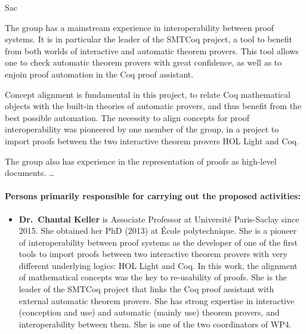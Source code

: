 \begin{sitedescription}{Sac}

The group has a mainstream experience in interoperability between proof
systems. It is in particular the leader of the SMTCoq project, a tool to
benefit from both worlds of interactive and automatic theorem provers.
This tool allows one to check automatic theorem provers with great
confidence, as well as to enjoin proof automation in the Coq proof
assistant.

Concept alignment is fundamental in this project, to relate Coq
mathematical objects with the built-in theories of automatic provers,
and thus benefit from the best possible automation. The necessity to
align concepts for proof interoperability was pioneered by one member of
the group, in a project to import proofs between the two interactive
theorem provers HOL Light and Coq.

The group also has experience in the representation of proofs as
high-level documents. \dots

\paragraph{Persons primarily responsible for carrying out the proposed
  activities:}

\begin{itemize} %

\item {\bf Dr.\ Chantal Keller} is Associate Professor at Université
  Paris-Saclay since 2015. She obtained her PhD (2013) at École
  polytechnique. She is a pioneer of interoperability between proof
  systems as the developer of one of the first tools to import proofs
  between two interactive theorem provers with very different underlying
  logics: HOL Light and Coq. In this work, the alignment of mathematical
  concepts was the key to re-usability of proofs. She is the leader of
  the SMTCoq project that links the Coq proof assistant with external
  automatic theorem provers. She has strong expertise in interactive
  (conception and use) and automatic (mainly use) theorem provers, and
  interoperability between them. She is one of the two coordinators of
  WP4.


\end{itemize}
\end{sitedescription}
